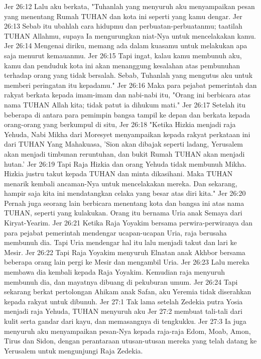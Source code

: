 Jer 26:12  Lalu aku berkata, "Tuhanlah yang menyuruh aku menyampaikan pesan yang menentang Rumah TUHAN dan kota ini seperti yang kamu dengar.
Jer 26:13  Sebab itu ubahlah cara hidupmu dan perbuatan-perbuatanmu; taatilah TUHAN Allahmu, supaya Ia mengurungkan niat-Nya untuk mencelakakan kamu.
Jer 26:14  Mengenai diriku, memang ada dalam kuasamu untuk melakukan apa saja menurut kemauanmu.
Jer 26:15  Tapi ingat, kalau kamu membunuh aku, kamu dan penduduk kota ini akan menanggung kesalahan atas pembunuhan terhadap orang yang tidak bersalah. Sebab, Tuhanlah yang mengutus aku untuk memberi peringatan itu kepadamu."
Jer 26:16  Maka para pejabat pemerintah dan rakyat berkata kepada imam-imam dan nabi-nabi itu, "Orang ini berbicara atas nama TUHAN Allah kita; tidak patut ia dihukum mati."
Jer 26:17  Setelah itu beberapa di antara para pemimpin bangsa tampil ke depan dan berkata kepada orang-orang yang berkumpul di situ,
Jer 26:18  "Ketika Hizkia menjadi raja Yehuda, Nabi Mikha dari Moresyet menyampaikan kepada rakyat perkataan ini dari TUHAN Yang Mahakuasa, 'Sion akan dibajak seperti ladang, Yerusalem akan menjadi timbunan reruntuhan, dan bukit Rumah TUHAN akan menjadi hutan.'
Jer 26:19  Tapi Raja Hizkia dan orang Yehuda tidak membunuh Mikha. Hizkia justru takut kepada TUHAN dan minta dikasihani. Maka TUHAN menarik kembali ancaman-Nya untuk mencelakakan mereka. Dan sekarang, hampir saja kita ini mendatangkan celaka yang besar atas diri kita."
Jer 26:20  Pernah juga seorang lain berbicara menentang kota dan bangsa ini atas nama TUHAN, seperti yang kulakukan. Orang itu bernama Uria anak Semaya dari Kiryat-Yearim.
Jer 26:21  Ketika Raja Yoyakim bersama perwira-perwiranya dan para pejabat pemerintah mendengar ucapan-ucapan Uria, raja berusaha membunuh dia. Tapi Uria mendengar hal itu lalu menjadi takut dan lari ke Mesir.
Jer 26:22  Tapi Raja Yoyakim menyuruh Elnatan anak Akhbor bersama beberapa orang lain pergi ke Mesir dan mengambil Uria.
Jer 26:23  Lalu mereka membawa dia kembali kepada Raja Yoyakim. Kemudian raja menyuruh membunuh dia, dan mayatnya dibuang di pekuburan umum.
Jer 26:24  Tapi sekarang berkat pertolongan Ahikam anak Safan, aku Yeremia tidak diserahkan kepada rakyat untuk dibunuh.
Jer 27:1  Tak lama setelah Zedekia putra Yosia menjadi raja Yehuda, TUHAN menyuruh aku
Jer 27:2  membuat tali-tali dari kulit serta gandar dari kayu, dan memasangnya di tengkukku.
Jer 27:3  Ia juga menyuruh aku menyampaikan pesan-Nya kepada raja-raja Edom, Moab, Amon, Tirus dan Sidon, dengan perantaraan utusan-utusan mereka yang telah datang ke Yerusalem untuk mengunjungi Raja Zedekia.
